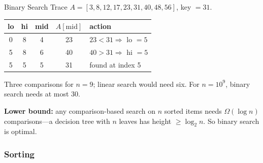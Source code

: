 \documentclass[11pt,a4paper]{article}
\begin{document}
\begin{worked}{Binary Search Trace}
$A = [3, 8, 12, 17, 23, 31, 40, 48, 56]$, key $= 31$.
\begin{center}
\begin{tabular}{c|c|c|c|l}
\toprule
lo & hi & mid & $A[\text{mid}]$ & action \\ \midrule
0 & 8 & 4 & 23 & $23 < 31 \Rightarrow$ lo $= 5$ \\
5 & 8 & 6 & 40 & $40 > 31 \Rightarrow$ hi $= 5$ \\
5 & 5 & 5 & 31 & found at index 5 \\
\bottomrule
\end{tabular}
\end{center}
Three comparisons for $n = 9$; linear search would need six. For $n = 10^9$, binary search needs at most 30.

\textbf{Lower bound:} any comparison-based search on $n$ sorted items needs $\Omega(\log n)$ comparisons---a decision tree with $n$ leaves has height $\ge \log_2 n$. So binary search is optimal.
\end{worked}

\subsubsection{Sorting}
\end{document}
